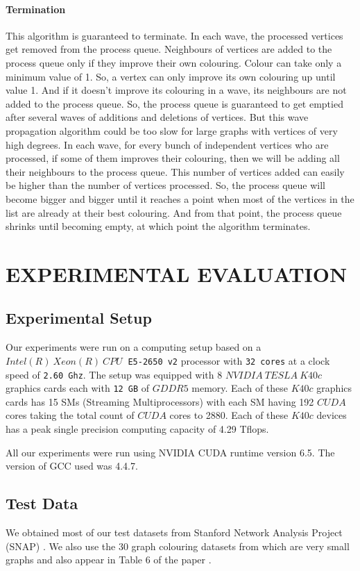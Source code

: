 \documentclass[MTech]{iitmdiss}
\begin{document}
\subsubsection{Termination}
This algorithm is guaranteed to terminate. In each wave, the processed vertices get removed from the process queue. Neighbours of vertices are added to the process queue only if they improve their own colouring. Colour can take only a minimum value of 1. So, a vertex can only improve its own colouring up until value 1. And if it doesn't improve its colouring in a wave, its neighbours are not added to the process queue. So, the process queue is guaranteed to get emptied after several waves of additions and deletions of vertices. But this wave propagation algorithm could be too slow for large graphs with vertices of very high degrees. In each wave, for every bunch of independent vertices who are processed, if some of them improves their colouring, then we will be adding all their neighbours to the process queue. This number of vertices added can easily be higher than the number of vertices processed. So, the process queue will become bigger and bigger until it reaches a point when most of the vertices in the list are already at their best colouring. And from that point, the process queue shrinks until becoming empty, at which point the algorithm terminates. 

\chapter{EXPERIMENTAL EVALUATION}
\section{Experimental Setup}
Our experiments were run on a computing setup based on a $Intel(R) \: Xeon(R) \: CPU \: $ \verb+E5-2650 v2+ processor with \verb+32 cores+ at a clock speed of \verb+2.60 Ghz+. The setup was equipped with 8 $NVIDIA \: TESLA \: K40c$ graphics cards each with \verb+12 GB+ of $GDDR5$ memory. Each of these $K40c$ graphics cards has 15 SMs (Streaming Multiprocessors) with each SM having 192 $CUDA$ cores taking the total count of $CUDA$ cores to 2880. Each of these $K40c$ devices has a peak single precision computing capacity of 4.29 Tflops.

All our experiments were run using NVIDIA CUDA runtime version 6.5. The version of GCC used was 4.4.7. 
\section{Test Data}
We obtained most of our test datasets from Stanford Network Analysis Project (SNAP) \citep{snapnets}. We also use the 30 graph colouring datasets from \citet{Beasley1990} which are very small graphs and also appear in Table 6 of the paper \cite{ref1}.
\end{document}
